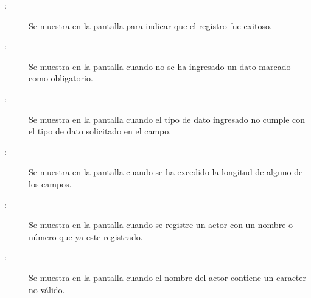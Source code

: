 	
\begin{description}
	\item[:] Se muestra en la pantalla  para indicar que el registro fue exitoso.
	\item[:] Se muestra en la pantalla  cuando no se ha ingresado un dato marcado como obligatorio.
	\item[:] Se muestra en la pantalla  cuando el tipo de dato ingresado no cumple con el tipo de dato solicitado en el campo.
	\item[:] Se muestra en la pantalla  cuando se ha excedido la longitud de alguno de los campos.
	\item[:] Se muestra en la pantalla  cuando se registre un actor con un nombre o número que ya este registrado.
	\item[:] Se muestra en la pantalla  cuando el nombre del actor contiene un caracter no válido.
\end{description}
